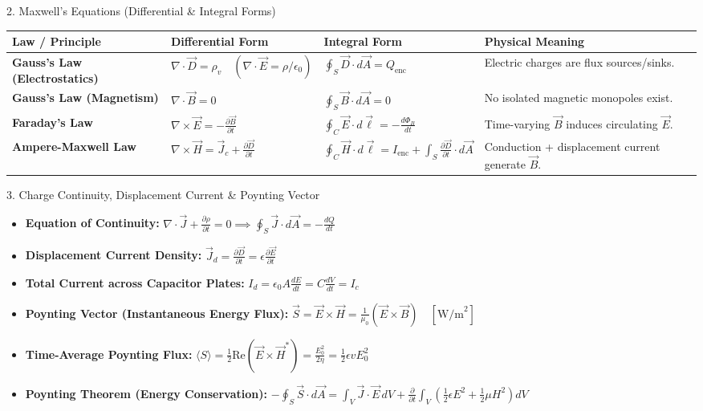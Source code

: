 \begin{formulabox}{2. Maxwell's Equations (Differential \& Integral Forms)}
\begin{tabularx}{\textwidth}{l X X l}
\toprule
\textbf{Law / Principle} & \textbf{Differential Form} & \textbf{Integral Form} & \textbf{Physical Meaning} \\
\midrule
\textbf{Gauss's Law (Electrostatics)} & $\nabla \cdot \vec{D} = \rho_v \quad (\nabla \cdot \vec{E} = \rho/\epsilon_0)$ & $\oint_S \vec{D} \cdot d\vec{A} = Q_{\text{enc}}$ & Electric charges are flux sources/sinks. \\
\textbf{Gauss's Law (Magnetism)} & $\nabla \cdot \vec{B} = 0$ & $\oint_S \vec{B} \cdot d\vec{A} = 0$ & No isolated magnetic monopoles exist. \\
\textbf{Faraday's Law} & $\nabla \times \vec{E} = -\frac{\partial \vec{B}}{\partial t}$ & $\oint_C \vec{E} \cdot d\vec{\ell} = -\frac{d\Phi_B}{dt}$ & Time-varying $\vec{B}$ induces circulating $\vec{E}$. \\
\textbf{Ampere-Maxwell Law} & $\nabla \times \vec{H} = \vec{J}_c + \frac{\partial \vec{D}}{\partial t}$ & $\oint_C \vec{H} \cdot d\vec{\ell} = I_{\text{enc}} + \int_S \frac{\partial \vec{D}}{\partial t} \cdot d\vec{A}$ & Conduction + displacement current generate $\vec{B}$. \\
\bottomrule
\end{tabularx}
\end{formulabox}

\begin{formulabox}{3. Charge Continuity, Displacement Current \& Poynting Vector}
\begin{itemize}[leftmargin=*,itemsep=2pt]
    \item \textbf{Equation of Continuity:} $\nabla \cdot \vec{J} + \frac{\partial \rho}{\partial t} = 0 \implies \oint_S \vec{J} \cdot d\vec{A} = -\frac{dQ}{dt}$
    \item \textbf{Displacement Current Density:} $\vec{J}_d = \frac{\partial \vec{D}}{\partial t} = \epsilon \frac{\partial \vec{E}}{\partial t}$
    \item \textbf{Total Current across Capacitor Plates:} $I_d = \epsilon_0 A \frac{dE}{dt} = C\frac{dV}{dt} = I_c$
    \item \textbf{Poynting Vector (Instantaneous Energy Flux):} $\vec{S} = \vec{E} \times \vec{H} = \frac{1}{\mu_0}(\vec{E} \times \vec{B}) \quad [\text{W/m}^2]$
    \item \textbf{Time-Average Poynting Flux:} $\langle S \rangle = \frac{1}{2}\text{Re}(\vec{E} \times \vec{H}^*) = \frac{E_0^2}{2\eta} = \frac{1}{2}\epsilon v E_0^2$
    \item \textbf{Poynting Theorem (Energy Conservation):} $-\oint_S \vec{S}\cdot d\vec{A} = \int_V \vec{J}\cdot\vec{E} \, dV + \frac{\partial}{\partial t}\int_V \left(\frac{1}{2}\epsilon E^2 + \frac{1}{2}\mu H^2\right) dV$
\end{itemize}
\end{formulabox}

